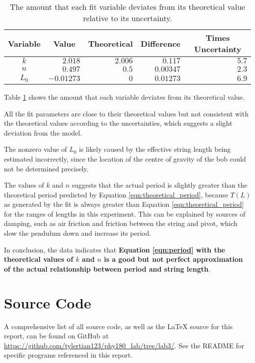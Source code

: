 \documentclass[aps,twocolumn,secnumarabic,nobalancelastpage,amsmath,amssymb,nofootinbib,floatfix,letterpaper]{revtex4}
\begin{document}
\begin{table}[ht]
    \begin{tabular}{c|r|r|r|r}
        Variable & \multicolumn{1}{c|}{Value} & \multicolumn{1}{c|}{Theoretical} & \multicolumn{1}{c|}{Difference} & \multicolumn{1}{c}{Times Uncertainty} \\
        \hline
        \(k\) & \(2.018\) & \(2.006\) & \(0.117\) & \(5.7\) \\
        \(n\) & \(0.497\) & \(0.5\) & \(0.00347\) & \(2.3\) \\
        \(L_0\) & \(-0.01273\) & \(0\) & \(0.01273\) & \(6.9\) \\
    \end{tabular}
    \caption{The amount that each fit variable deviates from its theoretical value relative to its uncertainty.}
    \label{table:lab3a_deviations}
\end{table}

Table \ref{table:lab3a_deviations} shows the amount that each variable deviates from its theoretical value.

All the fit parameters are close to their theoretical values but not consistent with the theoretical values according to
the uncertainties, which suggests a slight deviation from the model.

The nonzero value of \(L_0\) is likely caused by the effective string length being estimated incorrectly, since the
location of the centre of gravity of the bob could not be determined precisely.

The values of \(k\) and \(n\) suggests that the actual period is slightly greater than the theoretical period predicted
by Equation \ref{eqn:theoretical_period}, because \(T(L)\) as generated by the fit is always greater than Equation
\ref{eqn:theoretical_period} for the ranges of lengths in this experiment. This can be explained by sources of damping,
such as air friction and friction between the string and pivot, which slow the pendulum down and increase its period.

In conclusion, the data indicates that \textbf{Equation \ref{eqn:period} with the theoretical values of \(k\) and \(n\)
is a good but not perfect approximation of the actual relationship between period and string length}.


\appendix

\section{Source Code}

A comprehensive list of all source code, as well as the \LaTeX{} source for this report, can be found on GitHub at
\url{https://github.com/tylertian123/phy180_lab/tree/lab3/}. See the README for specific programs referenced in this
report.
\label{appendix:code}
\end{document}
